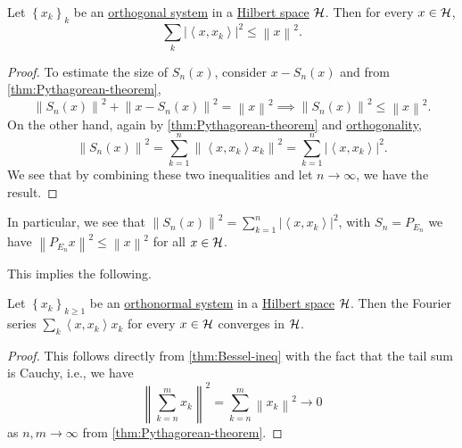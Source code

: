 \begin{theorem}\label{thm:Bessel-ineq}
	Let \(\left\{ x_k \right\} _k\) be an \hyperref[def:orthogonal-system]{orthogonal system} in a \hyperref[def:Hilbert-space]{Hilbert space} \(\mathcal{\MakeUppercase{h}} \). Then for every \(x\in \mathcal{\MakeUppercase{h}} \),
	\[
		\sum_{k} \left\vert \left\langle x, x_{k}  \right\rangle  \right\vert ^{2} \leq \left\lVert x\right\rVert ^{2} .
	\]
\end{theorem}
\begin{proof}
	To estimate the size of \(S_n(x)\), consider \(x - S_n(x)\) and from \autoref{thm:Pythagorean-theorem},
	\[
		\left\lVert S_n(x)\right\rVert ^{2} + \left\lVert x - S_n (x)\right\rVert ^{2} = \left\lVert x\right\rVert ^{2} \implies \left\lVert S_{n} (x)\right\rVert ^{2} \leq \left\lVert x\right\rVert ^{2}.
	\]
	On the other hand, again by \autoref{thm:Pythagorean-theorem} and \hyperref[def:orthogonal]{orthogonality},
	\[
		\left\lVert S_{n} (x)\right\rVert ^{2} = \sum_{k=1} ^n \left\lVert \left\langle x, x_k \right\rangle x_k \right\rVert ^{2} = \sum_{k=1} ^n \left\vert \left\langle x, x_k \right\rangle  \right\vert ^{2} .
	\]
	We see that by combining these two inequalities and let \(n\to \infty \), we have the result.
\end{proof}
\begin{remark}
	In particular, we see that \(\left\lVert S_n (x)\right\rVert ^{2} = \sum_{k=1}^{n} \left\vert \left\langle x, x_{k}  \right\rangle \right\vert ^{2}\), with \(S_n = P_{E_n}\) we have \(\left\lVert P_{E_n} x \right\rVert^{2} \leq \left\lVert x\right\rVert ^{2}\) for all \(x\in \mathcal{\MakeUppercase{h}} \).
\end{remark}

This implies the following.

\begin{corollary}\label{col:lec4}
	Let \(\left\{ x_k \right\} _{k \geq 1}\) be an \hyperref[def:orthonormal-system]{orthonormal system} in a \hyperref[def:Hilbert-space]{Hilbert space} \(\mathcal{\MakeUppercase{h}} \). Then the Fourier series \(\sum_{k} \left\langle x, x_{k}  \right\rangle x_{k}  \) for every \(x\in \mathcal{\MakeUppercase{h}} \) converges in \(\mathcal{\MakeUppercase{h}} \).
\end{corollary}
\begin{proof}
	This follows directly from \autoref{thm:Bessel-ineq} with the fact that the tail sum is Cauchy, i.e., we have
	\[
		\left\lVert \sum_{k=n}^m x_k\right\rVert ^2 = \sum_{k=n} ^m \left\lVert x_k\right\rVert ^{2} \to 0
	\]
	as \(n, m \to \infty \) from \autoref{thm:Pythagorean-theorem}.
\end{proof}

